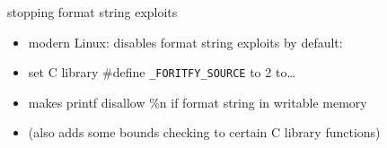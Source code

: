 \begin{frame}[fragile,label=fortify]{stopping format string exploits}
    \begin{itemize}
    \item modern Linux: disables format string exploits by default:
    \item set C library \#define \texttt{\_FORITFY\_SOURCE} to 2 to\ldots
    \vspace{.5cm}
    \item makes printf disallow \%n if format string in writable memory
    \item (also adds some bounds checking to certain C library functions)
    \end{itemize}
\end{frame}
